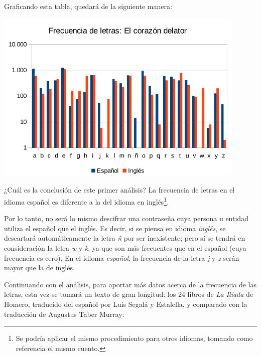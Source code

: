 \documentclass[12pt,a4paper,twoside]{book}
\begin{document}
Graficando esta tabla, quedará de la siguiente manera:

\includegraphics[width=0.9\textwidth]{img/frec-letras.pdf} 

¿Cuál es la conclusión de este primer análisis? La frecuencia de letras en el idioma español es diferente a la del idioma en inglés\footnote{Se podría aplicar el mismo procedimiento para otros idiomas, tomando como referencia el mismo cuento.}.

Por lo tanto, no será lo mismo descifrar una contraseña cuya persona u entidad utiliza el español que el inglés. Es decir, si se piensa en idioma \textit{inglés}, se descartará automáticamente la letra \textit{ñ} por ser inexistente; pero sí se tendrá en consideración la letra \textit{w} y \textit{k}, ya que son más frecuentes que en el español (cuya frecuencia es cero). En el idioma \textit{español}, la frecuencia de la letra \textit{j} y \textit{z} serán mayor que la de inglés.

Continuando con el análisis, para aportar más datos acerca de la frecuencia de las letras, esta vez se tomará un texto de gran longitud: los 24 libros de \textit{La Ilíada} de Homero, traducido del español por Luis Segalá y Estalella, y comparado con la traducción de Augustus Taber Murray:
\end{document}
